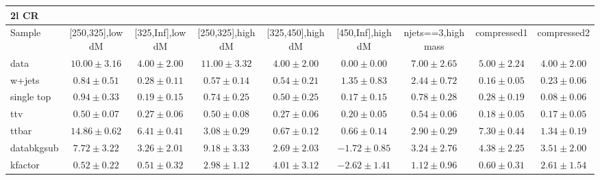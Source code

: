 \begin{table}
\begin{center}
\small
\begin{tabular}{lcccccccc}
\hline
2l CR & & & & & & & &\\
\hline
Sample&[250,325],low dM&[325,Inf],low dM&[250,325],high dM&[325,450],high dM&[450,Inf],high dM&njets==3,high mass&compressed1&compressed2\\
\hline
data&$10.00\pm3.16$&$4.00\pm2.00$&$11.00\pm3.32$&$4.00\pm2.00$&$0.00\pm0.00$&$7.00\pm2.65$&$5.00\pm2.24$&$4.00\pm2.00$\\
\hline
w+jets&$0.84\pm0.51$&$0.28\pm0.11$&$0.57\pm0.14$&$0.54\pm0.21$&$1.35\pm0.83$&$2.44\pm0.72$&$0.16\pm0.05$&$0.23\pm0.06$\\
single top&$0.94\pm0.33$&$0.19\pm0.15$&$0.74\pm0.25$&$0.50\pm0.25$&$0.17\pm0.15$&$0.78\pm0.28$&$0.28\pm0.19$&$0.08\pm0.06$\\
ttv&$0.50\pm0.07$&$0.27\pm0.06$&$0.50\pm0.08$&$0.27\pm0.06$&$0.20\pm0.05$&$0.54\pm0.06$&$0.18\pm0.05$&$0.17\pm0.05$\\
ttbar&$14.86\pm0.62$&$6.41\pm0.41$&$3.08\pm0.29$&$0.67\pm0.12$&$0.66\pm0.14$&$2.90\pm0.29$&$7.30\pm0.44$&$1.34\pm0.19$\\
databkgsub&$7.72\pm3.22$&$3.26\pm2.01$&$9.18\pm3.33$&$2.69\pm2.03$&$-1.72\pm0.85$&$3.24\pm2.76$&$4.38\pm2.25$&$3.51\pm2.00$\\
kfactor&$0.52\pm0.22$&$0.51\pm0.32$&$2.98\pm1.12$&$4.01\pm3.12$&$-2.62\pm1.41$&$1.12\pm0.96$&$0.60\pm0.31$&$2.61\pm1.54$\\
\hline\hline
\end{tabular}
\end{center}
\end{table}
